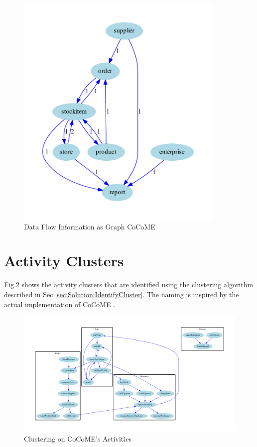 \begin{figure}[h!]
	\centering
	\includegraphics[width=10cm, trim={1cm 0cm 2cm 0cm}]{img/CoCoMEDataFlowGraph.pdf}
	\caption{Data Flow Information as Graph CoCoME}
	\label{fig:CoCoMEDataFlowGraph}
\end{figure}

\pagebreak

\section{Activity Clusters}
\label{sec:SolutionApplication:ActivityCluster}
Fig.\ref{fig:CoCoMEActivityCluster} shows the activity clusters that are identified using the clustering algorithm described in Sec.\ref{sec:Solution:IdentifyCluster}. The naming is inspired by the actual implementation of CoCoME \cite{NikoCoCoMEImpl}.

\begin{figure}[h!]
	\centering
	\begin{sideways}
		\includegraphics[width=19.0cm, trim={1.5cm 0cm 1.8cm 0cm}]{img/CoCoMEActivityCluster.pdf}
	\end{sideways}
	
	\caption{Clustering on CoCoME's Activities}
	\label{fig:CoCoMEActivityCluster}
\end{figure}



